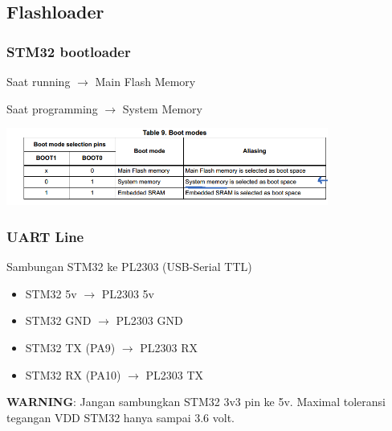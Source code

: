 \documentclass[table,dvipsnames]{beamer}
\begin{document}
	\subsection{Flashloader}
	\begin{frame}
	\frametitle{STM32 bootloader}
		\begin{block}{}
			Saat running $\rightarrow$ Main Flash Memory
		\end{block}
		\begin{block}{}
			Saat programming $\rightarrow$ System Memory
		\end{block}
		
		\begin{center}
			\includegraphics[width=300pt]{images/bootloader}
		\end{center}
	\end{frame}

	\begin{frame}
		\frametitle{UART Line}
		\begin{block}{}
			Sambungan STM32 ke PL2303 (USB-Serial TTL)
			\begin{itemize}
				\item STM32 5v $\rightarrow$ PL2303 5v
				\item STM32 GND $\rightarrow$ PL2303 GND
				\item STM32 TX (PA9) $\rightarrow$ PL2303 RX
				\item STM32 RX (PA10) $\rightarrow$ PL2303 TX
			\end{itemize}
		\end{block}
	
		\begin{block}{}
			\textbf{WARNING}: Jangan sambungkan STM32 3v3 pin ke 5v.
			Maximal toleransi tegangan VDD STM32 hanya sampai 3.6 volt.
		\end{block}
	\end{frame}
	
\end{document}
